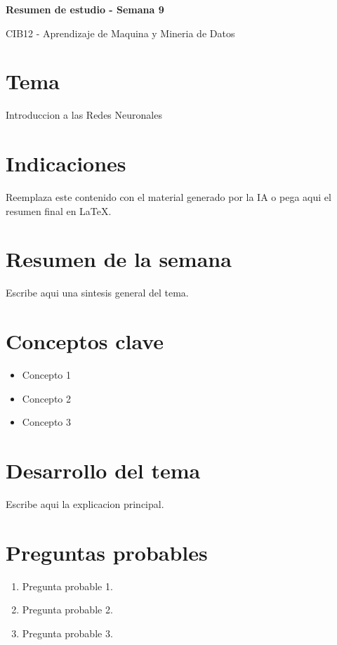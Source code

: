 \documentclass[8pt,a4paper,twocolumn]{article}
\newcommand{\resumentitulo}{Resumen de estudio - Semana 9}
\begin{document}
\vspace*{-1.0em}
\begin{tcolorbox}[colback=black!12,colframe=black!35,boxrule=0.3pt,arc=1pt,left=4pt,right=4pt,top=3pt,bottom=3pt]
{\bfseries\normalsize \resumentitulo\par}
{\scriptsize CIB12 - Aprendizaje de Maquina y Mineria de Datos\par}
\end{tcolorbox}
\vspace{0.15em}

\section*{Tema}
Introduccion a las Redes Neuronales

\section*{Indicaciones}
Reemplaza este contenido con el material generado por la IA o pega aqui el resumen final en LaTeX.

\section*{Resumen de la semana}
Escribe aqui una sintesis general del tema.

\section*{Conceptos clave}
\begin{itemize}
    \item Concepto 1
    \item Concepto 2
    \item Concepto 3
\end{itemize}

\section*{Desarrollo del tema}
Escribe aqui la explicacion principal.

\section*{Preguntas probables}
\begin{enumerate}
    \item Pregunta probable 1.
    \item Pregunta probable 2.
    \item Pregunta probable 3.
\end{enumerate}
\end{document}
